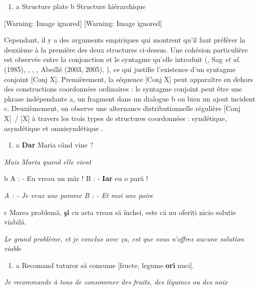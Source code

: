 \begin{enumerate}
\item \label{bkm:Ref301776256}a  Structure plate        b  Structure hiérarchique


\end{enumerate}
  [Warning: Image ignored] %
           [Warning: Image ignored] %
 

Cependant, il y a des arguments empiriques qui montrent qu'il faut préférer la deuxième à la première des deux structures ci-dessus. Une cohésion particulière est observée entre la conjonction et le syntagme qu'elle introduit (\citet{Ross1967}, Sag \textit{et al.} (1985), \citet{Munn1993}, \citet{Kayne1994}, \citet{Johannessen1998}, Abeillé (2003, 2005), \citet{Mouret2007}), ce qui justifie l'existence d'un syntagme conjoint [Conj X]. Premièrement, la séquence [Conj X] peut apparaître en dehors des constructions coordonnées ordinaires : le syntagme conjoint peut être une phrase indépendante a, un fragment dans un dialogue b ou bien un ajout incident c. Deuxièmement, on observe une alternance distributionnelle régulière [Conj X]~/ [X] à travers les trois types de structures coordonnées : syndétique, asyndétique et omnisyndétique . 


\begin{enumerate}
\item \label{bkm:Ref301775535}a  \textbf{Dar} Maria când vine ?


\end{enumerate}
{\itshape
Mais Maria quand elle vient}

  b  A : - Eu vreau un măr ! B : - \textbf{Iar} eu o pară !

{\itshape
A : - Je veux une pomme B : - Et moi une poire}

  c  Marea problemă, \textbf{şi} cu asta vreau să închei, este că nu oferiți nicio soluție viabilă.

\textit{Le grand problème, et je conclus avec ça, est que vous n'offrez aucune solution viabl}e


\begin{enumerate}
\item \label{bkm:Ref301776100}a  Recomand tuturor să consume [fructe, legume \textbf{ori} nuci].


\end{enumerate}
{\itshape
Je recommande à tous de consommer des fruits, des légumes ou des noix}

